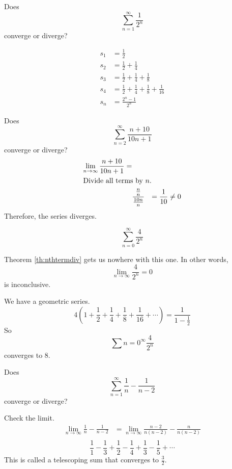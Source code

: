 \begin{ex}
  Does
  \[ \sum_{n=1}^{\infty} \frac{1}{2^n} \]
  converge or diverge?
  \begin{sol}
    \begin{align*}
      s_1 &= \frac{1}{2} \\
      s_2 &= \frac{1}{2} + \frac{1}{4} \\
      s_3 &= \frac{1}{2}+ \frac{1}{4} + \frac{1}{8} \\
      s_4 &= \frac{1}{2}+ \frac{1}{4} + \frac{1}{8} + \frac{1}{16} \\
      s_n &= \frac{2^n-1}{2^n}
    \end{align*}
  \end{sol}
\end{ex}
\begin{ex}
  Does
  \[\sum_{n=2}^{\infty} \frac{n+10}{10n+1} \]
  converge or diverge?
  \begin{align*}
    \lim_{n \to \infty} \frac{n+10}{10n+1} = \\
    \intertext{Divide all terms by \(n\).}
    & \frac{\frac{n}{n}}{\frac{10n}{n}}&=\frac{1}{10} \neq 0 \\
  \end{align*}
  Therefore, the series diverges.
\end{ex}
\begin{ex}
  \[ \sum_{n=0}^\infty \frac{4}{2^n} \]
  \begin{sol}
    Theorem \ref{th:nthtermdiv} gets us nowhere with this one. In other words,
    \[ \lim_{n \to \infty} \frac{4}{2^n} = 0 \]
    is inconclusive.

    We have a geometric series.
    \[ 4 \left( 1+ \frac{1}{2} + \frac{1}{4} + \frac{1}{8} + \frac{1}{16} + \cdots \right) = \frac{1}{1-\frac{1}{2}} \]
    So
    \[ \sum{n=0}^\infty \frac{4}{2^n} \]
    converges to \(8\).
  \end{sol}
\end{ex}
\begin{ex}
  Does
  \[ \sum_{n=1}^\infty \frac{1}{n}-\frac{1}{n-2} \]
  converge or diverge?
  \begin{sol}
    Check the limit.
    \begin{align*}
      \lim_{n \to \infty} \frac{1}{n} - \frac{1}{n-2} &=
      \lim_{n \to \infty} \frac{n-2}{n(n-2)} - \frac{n}{n(n-2)} \\
    \end{align*}
    \[
      \frac{1}{1}-\frac{1}{3}+\frac{1}{2}-\frac{1}{4}+\frac{1}{3}-\frac{1}{5}+\cdots
    \]
    This is called a telescoping sum that converges to \(\frac{3}{2}\).
  \end{sol}
\end{ex}
